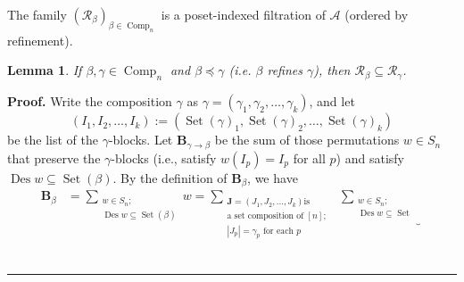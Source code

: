 \documentclass[submission]{FPSAC2026}
\newtheorem{lem}{Lemma}
\newcommand{\Des}{\operatorname{Des}}
\newcommand{\Comp}{\operatorname{Comp}}
\newcommand{\Set}{\operatorname{Set}}
\newcommand{\tup}[1]{\left( #1 \right)}
\newenvironment{proof}[1][Proof]{\noindent\textbf{#1.} }{\ \rule{0.5em}{0.5em}}
\begin{document}
The family \((\mathcal R_\beta)_{\beta\in\Comp_n}\) is a poset-indexed
filtration of \(\mathcal A\) (ordered by refinement).

\begin{lem}\label{prop.Rbeta.sub}
If \(\beta,\gamma\in\Comp_n\) and \(\beta\preceq\gamma\) (i.e. \(\beta\) refines \(\gamma\)), then
\(\mathcal R_\beta\subseteq\mathcal R_\gamma\).
\end{lem}

\begin{proof}
Write the composition $\gamma$ as $\gamma=\left(  \gamma_{1},\gamma_{2}%
,\ldots,\gamma_{k}\right)  $, and let
\[
\left(  I_{1},I_{2},\ldots
,I_{k}\right)  :=\left(  \operatorname*{Set}\left(  \gamma\right)
_{1},\operatorname*{Set}\left(  \gamma\right)  _{2},\ldots,\operatorname*{Set}%
\left(  \gamma\right)  _{k}\right)
\]
be the list of the $\gamma$-blocks. Let
$\mathbf{B}_{\gamma\rightarrow\beta}$ be the sum of those permutations $w\in
S_{n}$ that preserve the $\gamma$-blocks (i.e., satisfy $w\left(
I_{p}\right)  =I_{p}$ for all $p$) and satisfy $\Des w
\subseteq\operatorname*{Set}\left(  \beta\right)  $. By the definition of
$\mathbf{B}_{\beta}$, we have%
\begin{align*}
\mathbf{B}_{\beta} &  =\sum_{\substack{w\in S_{n};\\ \Des w
\subseteq\operatorname*{Set}\left(  \beta\right)  }}w=\sum
_{\substack{\mathbf{J}=\left(  J_{1},J_{2},\ldots,J_{k}\right)  \text{
is}\\\text{a set composition of }\left[  n\right]  ;\\\left\vert
J_{p}\right\vert =\gamma_{p}\text{ for each }p}}\ \ \underbrace{\sum
_{\substack{w\in S_{n};\\ \Des w \subseteq\operatorname*{Set}%
}}}
\end{align*}
\end{proof}
\end{document}
